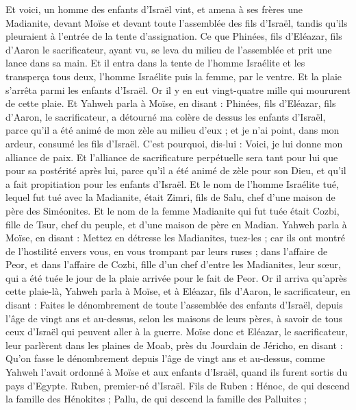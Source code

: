 \begin{multicols}{2}
Et voici, un homme des enfants d'Israël vint, et amena à ses frères une Madianite, devant Moïse et devant toute l'assemblée des fils d'Israël, tandis qu'ils pleuraient à l'entrée de la tente d'assignation.
Ce que Phinées, fils d'Eléazar, fils d'Aaron le sacrificateur, ayant vu, se leva du milieu de l'assemblée et prit une lance dans sa main.
Et il entra dans la tente de l'homme Israélite et les transperça tous deux, l'homme Israélite puis la femme, par le ventre. Et la plaie s'arrêta parmi les enfants d'Israël.
Or il y en eut vingt-quatre mille qui moururent de cette plaie.
Et Yahweh parla à Moïse, en disant :
Phinées, fils d'Eléazar, fils d'Aaron, le sacrificateur, a détourné ma colère de dessus les enfants d'Israël, parce qu'il a été animé de mon zèle au milieu d'eux ; et je n'ai point, dans mon ardeur, consumé les fils d'Israël.
C’est pourquoi, dis-lui : Voici, je lui donne mon alliance de paix.
Et l'alliance de sacrificature perpétuelle sera tant pour lui que pour sa postérité après lui, parce qu'il a été animé de zèle pour son Dieu, et qu'il a fait propitiation pour les enfants d'Israël.
Et le nom de l'homme Israélite tué, lequel fut tué avec la Madianite, était Zimri, fils de Salu, chef d'une maison de père des Siméonites.
Et le nom de la femme Madianite qui fut tuée était Cozbi, fille de Tsur, chef du peuple, et d'une maison de père en Madian.
Yahweh parla à Moïse, en disant :
Mettez en détresse les Madianites, tuez-les ;
car ils ont montré de l’hostilité envers vous, en vous trompant par leurs ruses ; dans l'affaire de Peor, et dans l'affaire de Cozbi, fille d'un chef d'entre les Madianites, leur sœur, qui a été tuée le jour de la plaie arrivée pour le fait de Peor.
\VerseOne{} Or il arriva qu'après cette plaie-là, Yahweh parla à Moïse, et à Eléazar, fils d'Aaron, le sacrificateur, en disant :
Faites le dénombrement de toute l'assemblée des enfants d'Israël, depuis l'âge de vingt ans et au-dessus, selon les maisons de leurs pères, à savoir de tous ceux d'Israël qui peuvent aller à la guerre.
Moïse donc et Eléazar, le sacrificateur, leur parlèrent dans les plaines de Moab, près du Jourdain de Jéricho, en disant :
Qu’on fasse le dénombrement depuis l'âge de vingt ans et au-dessus, comme Yahweh l'avait ordonné à Moïse et aux enfants d'Israël, quand ils furent sortis du pays d'Egypte.
Ruben, premier-né d'Israël. Fils de Ruben : Hénoc, de qui descend la famille des Hénokites ; Pallu, de qui descend la famille des Palluites ;

\end{multicols}
